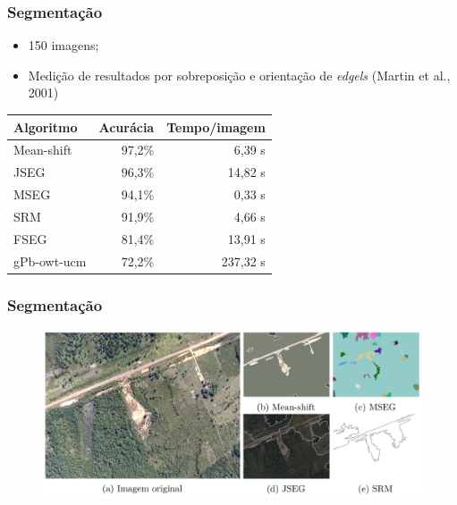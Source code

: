 \documentclass[t]{beamer}
\begin{document}
\begin{frame}
	\frametitle{Segmentação}
	
	\begin{itemize}
		\item 150 imagens;
		\item Medição de resultados por sobreposição e orientação de \textit{edgels} (Martin et al., 2001)
	\end{itemize}
	
	\small{
	\begin{table}
	\centering
	\begin{tabulary}{\linewidth}{|L|R|R|}
		\hline
		\textbf{Algoritmo} & \textbf{Acurácia} & \textbf{Tempo/imagem} \\ \hline
		Mean-shift  & 97,2\% & 6,39 s \\ \hline
		JSEG        & 96,3\% & 14,82 s \\ \hline
		MSEG        & 94,1\% & 0,33 s \\ \hline
		SRM         & 91,9\% & 4,66 s \\ \hline
		FSEG        & 81,4\% & 13,91 s \\ \hline
		gPb-owt-ucm & 72,2\% & 237,32 s \\ \hline
	\end{tabulary}
	\end{table}
	}

\end{frame}

\begin{frame}[c]
	\frametitle{Segmentação}

	\begin{figure}[c]
  		\centering
		\includegraphics[width=\textwidth]{imgs/gambi_apresentacao}
	\end{figure}

\end{frame}
\end{document}

